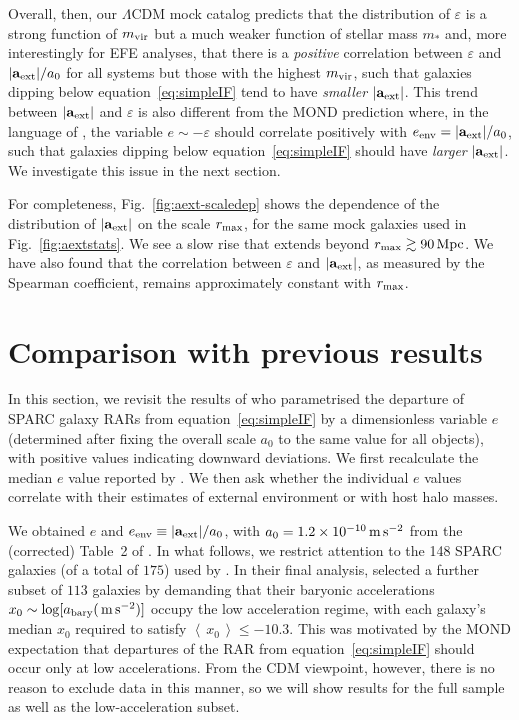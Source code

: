 \documentclass[usenatbib]{mnras}
\newcommand{\abary}{\ensuremath{a_{\rm bary}}}
\newcommand{\aext}{\ensuremath{\mathbf{a}_{\rm ext}}}
\newcommand{\msq}{\ensuremath{{\rm \,m\,s}^{-2}}}
\newcommand{\avg}[1]{\ensuremath{\left\langle \,#1\, \right\rangle}}
\newcommand{\eqn}[1]{equation~\eqref{#1}}
\begin{document}
Overall, then, our $\Lambda$CDM mock catalog predicts that the distribution of $\varepsilon$ is a strong function of $m_{\rm vir}$ but a much weaker function of stellar mass $m_\ast$ and, more interestingly for EFE analyses, that there is a \emph{positive} correlation between $\varepsilon$ and $|\aext|/a_0$ for all systems but those with the highest $m_{\rm vir}$, such that galaxies dipping below \eqn{eq:simpleIF} tend to have \emph{smaller} $|\aext|$. 
This trend between $|\aext|$ and $\varepsilon$ is also different from the MOND prediction where, in the language of , the variable $e\sim-\varepsilon$ should correlate positively with $e_{\rm env}=|\aext|/a_0$, such that galaxies dipping below \eqn{eq:simpleIF} should have \emph{larger} $|\aext|$. We investigate this issue in the next section.


For completeness, Fig.~\ref{fig:aext-scaledep} shows the dependence of the distribution of $|\aext|$ on the scale $r_{\rm max}$, for the same mock galaxies used in Fig.~\ref{fig:aextstats}. We see a slow rise that extends beyond $r_{\rm max}\gtrsim90\,{\rm Mpc}$. We have also found that the correlation between $\varepsilon$ and $|\aext|$, as measured by the Spearman coefficient, remains approximately constant with $r_{\rm max}$.


\section{Comparison with previous results}
\label{sec:compare}
%
In this section, we revisit the results of  who parametrised the departure of SPARC galaxy RARs from \eqn{eq:simpleIF} by a dimensionless variable $e$ (determined after fixing the overall scale $a_0$ to the same value for all objects), with positive values indicating downward deviations.  We first recalculate the median $e$ value reported by .  We then ask whether the individual $e$ values correlate with their estimates of external environment or with host halo masses. 

We obtained $e$ and $e_{\rm env}\equiv|\aext|/a_0$, with $a_0=1.2\times10^{-10}\msq$ from the (corrected) Table~2 of \citet{efe-erratum}.  In what follows, we restrict attention to the 148 SPARC galaxies (of a total of $175$) used by . In their final analysis,  selected a further subset of $113$ galaxies by demanding that their baryonic accelerations $x_0\sim\log[\abary (\msq)]$ occupy the low acceleration regime, with each galaxy's median $x_0$ required to satisfy $\avg{x_0}\leq-10.3$. This was motivated by the MOND expectation that departures of the RAR from \eqn{eq:simpleIF} should occur only at low accelerations. From the CDM viewpoint, however, there is no reason to exclude data in this manner, so we will show results for the full sample as well as the low-acceleration subset. 
\end{document}
